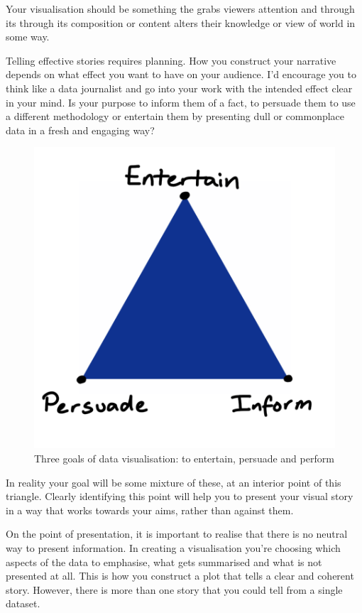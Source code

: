 \documentclass[
  12pt,
]{book}
\begin{document}
Your visualisation should be something the grabs viewers attention and through its through its composition or content alters their knowledge or view of world in some way.

Telling effective stories requires planning. How you construct your narrative depends on what effect you want to have on your audience. I'd encourage you to think like a data journalist and go into your work with the intended effect clear in your mind. Is your purpose to inform them of a fact, to persuade them to use a different methodology or entertain them by presenting dull or commonplace data in a fresh and engaging way?

\begin{figure}
\centering
\includegraphics{images/303-data-visualisation/entertain-persuade-inform.png}
\caption{Three goals of data visualisation: to entertain, persuade and perform}
\end{figure}

In reality your goal will be some mixture of these, at an interior point of this triangle. Clearly identifying this point will help you to present your visual story in a way that works towards your aims, rather than against them.

On the point of presentation, it is important to realise that there is no neutral way to present information. In creating a visualisation you're choosing which aspects of the data to emphasise, what gets summarised and what is not presented at all. This is how you construct a plot that tells a clear and coherent story. However, there is more than one story that you could tell from a single dataset.
\end{document}

